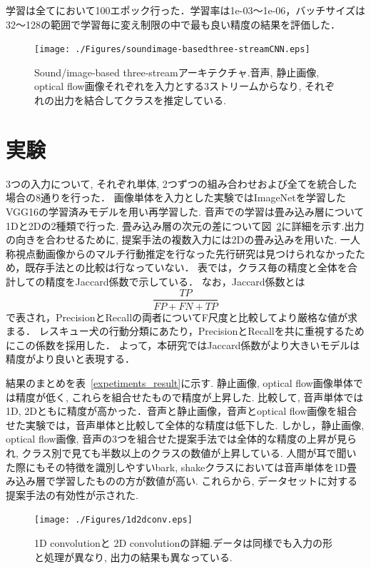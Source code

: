 \documentclass[MIRU,submit]{miru2019j}
\begin{document}
学習は全てにおいて100エポック行った．学習率は1e-03〜1e-06，バッチサイズは32〜128の範囲で学習毎に変え制限の中で最も良い精度の結果を評価した．

\begin{figure}[tb]
   \begin{center}
    \texttt{[image: ./Figures/soundimage-basedthree-streamCNN.eps]}
    \caption{Sound/image-based three-streamアーキテクチャ.音声, 静止画像, optical flow画像それぞれを入力とする3ストリームからなり, それぞれの出力を結合してクラスを推定している.}
    \label{sound3st}
   \end{center}
\end{figure}

\section{実験}

3つの入力について, それぞれ単体, 2つずつの組み合わせおよび全てを統合した場合の8通りを行った．%
画像単体を入力とした実験ではImageNetを学習したVGG16の学習済みモデルを用い再学習した.
音声での学習は畳み込み層について1Dと2Dの2種類で行った.
畳み込み層の次元の差について図~\ref{1d2dconv}に詳細を示す.出力の向きを合わせるために, 提案手法の複数入力には2Dの畳み込みを用いた.
一人称視点動画像からのマルチ行動推定を行なった先行研究は見つけられなかったため，既存手法との比較は行なっていない．
表では，クラス毎の精度と全体を合計しての精度をJaccard係数で示している．
なお，Jaccard係数とは$$\frac{TP}{FP+FN+TP}$$で表され，PrecisionとRecallの両者についてF尺度と比較してより厳格な値が求まる．
レスキュー犬の行動分類にあたり，PrecisionとRecallを共に重視するためにこの係数を採用した．
よって，本研究ではJaccard係数がより大きいモデルは精度がより良いと表現する．

結果のまとめを表~\ref{expetiments_result}に示す.
静止画像, optical flow画像単体では精度が低く, これらを組合せたもので精度が上昇した.
比較して, 音声単体では1D, 2Dともに精度が高かった．音声と静止画像，音声とoptical flow画像を組合せた実験では，音声単体と比較して全体的な精度は低下した.
しかし，静止画像, optical flow画像, 音声の3つを組合せた提案手法では全体的な精度の上昇が見られ, クラス別で見ても半数以上のクラスの数値が上昇している.
人間が耳で聞いた際にもその特徴を識別しやすいbark, shakeクラスにおいては音声単体を1D畳み込み層で学習したものの方が数値が高い.
これらから, データセットに対する提案手法の有効性が示された.

\begin{figure}[tb]
   \begin{center}
    \texttt{[image: ./Figures/1d2dconv.eps]}
    \caption{1D convolutionと 2D convolutionの詳細.データは同様でも入力の形と処理が異なり, 出力の結果も異なっている.}
    \label{1d2dconv}
   \end{center}
\end{figure}
\end{document}
